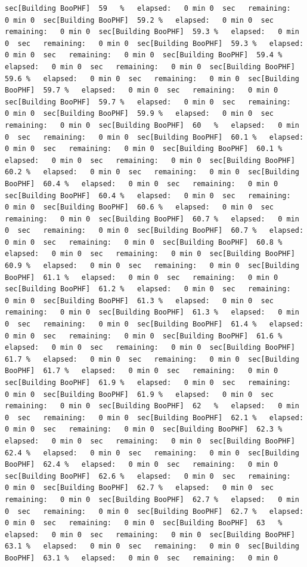\documentclass[
]{book}
\begin{document}
\begin{verbatim}
sec[Building BooPHF]  59   %   elapsed:   0 min 0  sec   remaining:   0 min 0  sec[Building BooPHF]  59.2 %   elapsed:   0 min 0  sec   remaining:   0 min 0  sec[Building BooPHF]  59.3 %   elapsed:   0 min 0  sec   remaining:   0 min 0  sec[Building BooPHF]  59.3 %   elapsed:   0 min 0  sec   remaining:   0 min 0  sec[Building BooPHF]  59.4 %   elapsed:   0 min 0  sec   remaining:   0 min 0  sec[Building BooPHF]  59.6 %   elapsed:   0 min 0  sec   remaining:   0 min 0  sec[Building BooPHF]  59.7 %   elapsed:   0 min 0  sec   remaining:   0 min 0  sec[Building BooPHF]  59.7 %   elapsed:   0 min 0  sec   remaining:   0 min 0  sec[Building BooPHF]  59.9 %   elapsed:   0 min 0  sec   remaining:   0 min 0  sec[Building BooPHF]  60   %   elapsed:   0 min 0  sec   remaining:   0 min 0  sec[Building BooPHF]  60.1 %   elapsed:   0 min 0  sec   remaining:   0 min 0  sec[Building BooPHF]  60.1 %   elapsed:   0 min 0  sec   remaining:   0 min 0  sec[Building BooPHF]  60.2 %   elapsed:   0 min 0  sec   remaining:   0 min 0  sec[Building BooPHF]  60.4 %   elapsed:   0 min 0  sec   remaining:   0 min 0  sec[Building BooPHF]  60.4 %   elapsed:   0 min 0  sec   remaining:   0 min 0  sec[Building BooPHF]  60.6 %   elapsed:   0 min 0  sec   remaining:   0 min 0  sec[Building BooPHF]  60.7 %   elapsed:   0 min 0  sec   remaining:   0 min 0  sec[Building BooPHF]  60.7 %   elapsed:   0 min 0  sec   remaining:   0 min 0  sec[Building BooPHF]  60.8 %   elapsed:   0 min 0  sec   remaining:   0 min 0  sec[Building BooPHF]  60.9 %   elapsed:   0 min 0  sec   remaining:   0 min 0  sec[Building BooPHF]  61.1 %   elapsed:   0 min 0  sec   remaining:   0 min 0  sec[Building BooPHF]  61.2 %   elapsed:   0 min 0  sec   remaining:   0 min 0  sec[Building BooPHF]  61.3 %   elapsed:   0 min 0  sec   remaining:   0 min 0  sec[Building BooPHF]  61.3 %   elapsed:   0 min 0  sec   remaining:   0 min 0  sec[Building BooPHF]  61.4 %   elapsed:   0 min 0  sec   remaining:   0 min 0  sec[Building BooPHF]  61.6 %   elapsed:   0 min 0  sec   remaining:   0 min 0  sec[Building BooPHF]  61.7 %   elapsed:   0 min 0  sec   remaining:   0 min 0  sec[Building BooPHF]  61.7 %   elapsed:   0 min 0  sec   remaining:   0 min 0  sec[Building BooPHF]  61.9 %   elapsed:   0 min 0  sec   remaining:   0 min 0  sec[Building BooPHF]  61.9 %   elapsed:   0 min 0  sec   remaining:   0 min 0  sec[Building BooPHF]  62   %   elapsed:   0 min 0  sec   remaining:   0 min 0  sec[Building BooPHF]  62.1 %   elapsed:   0 min 0  sec   remaining:   0 min 0  sec[Building BooPHF]  62.3 %   elapsed:   0 min 0  sec   remaining:   0 min 0  sec[Building BooPHF]  62.4 %   elapsed:   0 min 0  sec   remaining:   0 min 0  sec[Building BooPHF]  62.4 %   elapsed:   0 min 0  sec   remaining:   0 min 0  sec[Building BooPHF]  62.6 %   elapsed:   0 min 0  sec   remaining:   0 min 0  sec[Building BooPHF]  62.7 %   elapsed:   0 min 0  sec   remaining:   0 min 0  sec[Building BooPHF]  62.7 %   elapsed:   0 min 0  sec   remaining:   0 min 0  sec[Building BooPHF]  62.7 %   elapsed:   0 min 0  sec   remaining:   0 min 0  sec[Building BooPHF]  63   %   elapsed:   0 min 0  sec   remaining:   0 min 0  sec[Building BooPHF]  63.1 %   elapsed:   0 min 0  sec   remaining:   0 min 0  sec[Building BooPHF]  63.1 %   elapsed:   0 min 0  sec   remaining:   0 min 0  
\end{verbatim}
\end{document}

